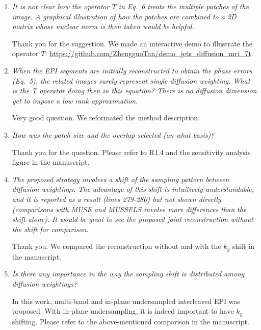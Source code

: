 \documentclass[a4paper,11pt,twoside]{report}
\begin{document}
\begin{enumerate}
    \item \textit{It is not clear how the operator $T$ in Eq.~6 treats the multiple patches of the image. A graphical illustration of how the patches are combined to a 2D matrix whose nuclear norm is then taken would be helpful.}

    Thank you for the suggestion. We made an interactive demo
    to illustrate the operator $T$:
    \url{https://github.com/ZhengguoTan/demo_jets_diffusion_mri_7t}.

    \item \textit{When the EPI segments are initially reconstructed to obtain the phase errors (Eq.~5), the related images surely represent single diffusion weighting. What is the T operator doing then in this equation? There is no diffusion dimension yet to impose a low rank approximation.}

    \hspace{1em} Very good question. We reformated the method description.

    \item \textit{How was the patch size and the overlap selected (on what basis)?}

    \hspace{1em} Thank you for the question.
    Please refer to R1.4 and the sensitivity analysis figure
    in the manuscript.

    \item \textit{The proposed strategy involves a shift of the sampling pattern between diffusion weightings. The advantage of this shift is intuitively understandable, and it is reported as a result (lines 279-280) but not shown directly (comparisons with MUSE and MUSSELS involve more differences than the shift alone). It would be great to see the proposed joint reconstruction without the shift for comparison.}

    \hspace{1em} Thank you. We compared the reconstruction
    without and with the $k_y$ shift in the manuscript.

    \item \textit{Is there any importance in the way the sampling shift is distributed among diffusion weightings?}

    \hspace{1em} In this work, multi-band and in-plane undersampled
    interleaved EPI was proposed.
    With in-plane undersampling,
    it is indeed important to have $k_y$ shifting.
    Please refer to the above-mentioned comparison in the manuscript.


\end{enumerate}
\end{document}
